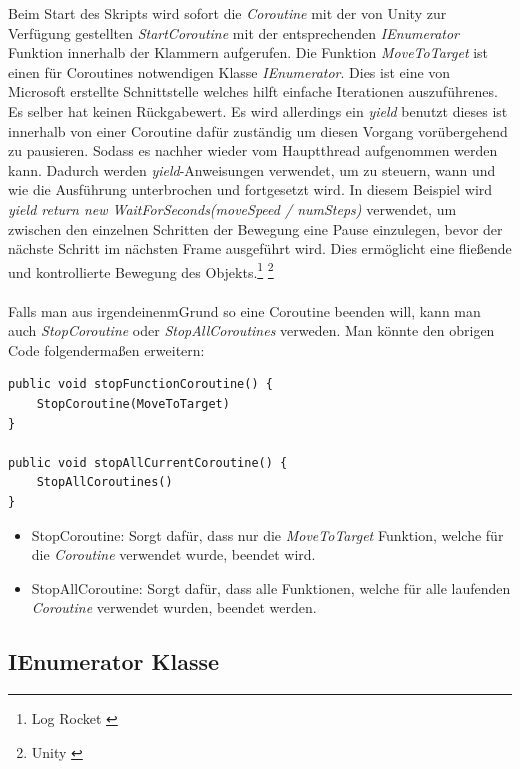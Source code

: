 Beim Start des Skripts wird sofort die \textit{Coroutine} mit der von Unity zur Verfügung gestellten \textit{StartCoroutine} mit der entsprechenden \textit{IEnumerator} Funktion innerhalb der Klammern aufgerufen. Die Funktion \textit{MoveToTarget} ist einen für Coroutines notwendigen Klasse \textit{IEnumerator}. Dies ist eine von Microsoft erstellte Schnittstelle welches hilft einfache Iterationen auszuführenes. Es selber hat keinen Rückgabewert. Es wird allerdings ein \textit{yield} benutzt dieses ist innerhalb von einer Coroutine dafür zuständig um diesen Vorgang vorübergehend zu pausieren. Sodass es nachher wieder vom Hauptthread aufgenommen werden kann. Dadurch werden \textit{yield}-Anweisungen verwendet, um zu steuern, wann und wie die Ausführung unterbrochen und fortgesetzt wird. In diesem Beispiel wird \textit{yield return new WaitForSeconds(moveSpeed / numSteps)} verwendet, um zwischen den einzelnen Schritten der Bewegung eine Pause einzulegen, bevor der nächste Schritt im nächsten Frame ausgeführt wird. Dies ermöglicht eine fließende und kontrollierte Bewegung des Objekts.\protect\footnote{Log Rocket \cite{Coroutine2}} \footnote{ Unity \cite{Coroutine}}\\
\\
Falls man aus irgendeinenmGrund so eine Coroutine beenden will, kann man auch \textit{StopCoroutine} oder \textit{StopAllCoroutines} verweden. Man könnte den obrigen Code folgendermaßen erweitern:
\begin{lstlisting}[style=csharp, caption={Coroutine beenden}, label=code:debugRaycast]
public void stopFunctionCoroutine() {
    StopCoroutine(MoveToTarget)
}

public void stopAllCurrentCoroutine() {
    StopAllCoroutines()
}
\end{lstlisting}
\begin{itemize}
    \item StopCoroutine: Sorgt dafür, dass nur die \textit{MoveToTarget} Funktion, welche für die \textit{Coroutine} verwendet wurde, beendet wird.
    \item StopAllCoroutine: Sorgt dafür, dass alle Funktionen, welche für alle laufenden \textit{Coroutine} verwendet wurden, beendet werden.
\end{itemize}

\subsection{IEnumerator Klasse}\label{sec:IEnumerator}

